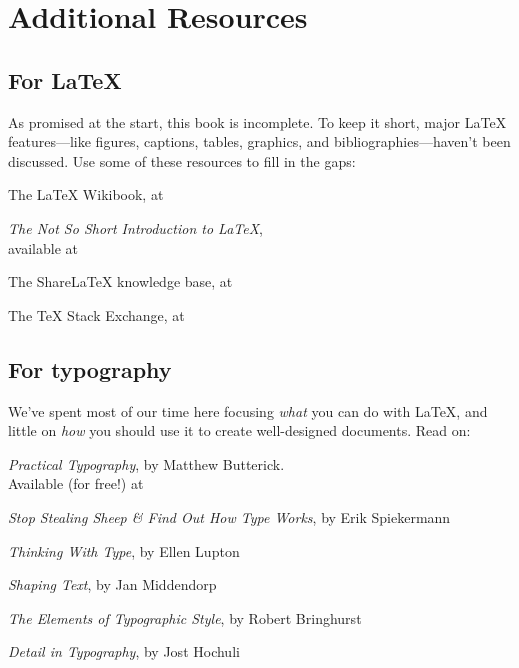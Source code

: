 \setlength\parskip{0.55\baselineskip}
\setlength\parindent{0pt}

\chapter{Additional Resources}
\label{resources}

\section{For \texorpdfstring{\LaTeX}{LaTeX}}

As promised at the start, this book is incomplete.
To keep it short,
major \LaTeX{} features---like figures, captions, tables, graphics,
and bibliographies---haven't been discussed.
Use some of these resources to fill in the gaps:
\begin{leftfigure}
The \LaTeX{} Wikibook, at 

\textit{The Not So Short Introduction to \LaTeX}, \\
available at 

The Share\LaTeX{} knowledge base, at 

The \TeX{} Stack Exchange, at 
\end{leftfigure}

\section{For typography}

We've spent most of our time here focusing \emph{what} you can do with \LaTeX,
and little on \emph{how} you should use it to create well-designed documents.
Read on:
\begin{leftfigure}
\textit{Practical Typography}, by Matthew Butterick. \\
Available (for free!) at 

\textit{Stop Stealing Sheep \& Find Out How Type Works}, by Erik Spiekermann

\textit{Thinking With Type}, by Ellen Lupton

\textit{Shaping Text}, by Jan Middendorp

\textit{The Elements of Typographic Style}, by Robert Bringhurst

\textit{Detail in Typography}, by Jost Hochuli
\end{leftfigure}

